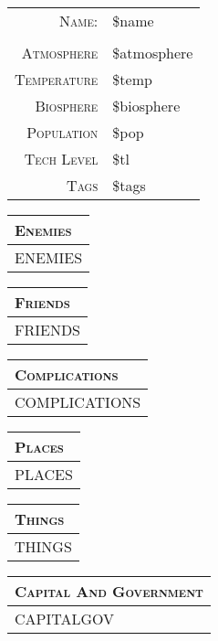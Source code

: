 \documentclass[12pt,letterpaper,twocolumn]{article}
\begin{document}
\begin{tabularx}{\linewidth}{ r | X |}
    \cline{2-2}
    \textsc{Name:} & \$name \\
    \cline{2-2}
    \multicolumn{2}{c}{} \\
    \cline{2-2}
    \textsc{Atmosphere} & \$atmosphere \\
    \cline{2-2}
    \textsc{Temperature} & \$temp \\
    \cline{2-2}
    \textsc{Biosphere} & \$biosphere \\
    \cline{2-2}
    \textsc{Population} & \$pop \\
    \cline{2-2}
    \textsc{Tech Level} & \$tl \\
    \cline{2-2}
    \textsc{Tags} & \$tags \\
    \cline{2-2}
\end{tabularx}

\begin{tabularx}{\linewidth}{| X |}
    \multicolumn{1}{l}{\textsc{Enemies}} \\
    \hline
    ENEMIES \\
    \hline
\end{tabularx}

\begin{tabularx}{\linewidth}{| X |}
    \multicolumn{1}{l}{\textsc{Friends}} \\
    \hline
    FRIENDS \\
    \hline
\end{tabularx}

\begin{tabularx}{\linewidth}{| X |}
    \multicolumn{1}{l}{\textsc{Complications}} \\
    \hline
    COMPLICATIONS \\
    \hline
\end{tabularx}

\begin{tabularx}{\linewidth}{| X |}
    \multicolumn{1}{l}{\textsc{Places}} \\
    \hline
    PLACES \\
    \hline
\end{tabularx}

\begin{tabularx}{\linewidth}{| X |}
    \multicolumn{1}{l}{\textsc{Things}} \\
    \hline
    THINGS \\
    \hline
\end{tabularx}

\begin{tabularx}{\linewidth}{| X |}
    \multicolumn{1}{l}{\textsc{Capital And Government}} \\
    \hline
    CAPITALGOV \\
    \hline
\end{tabularx}
\end{document}
